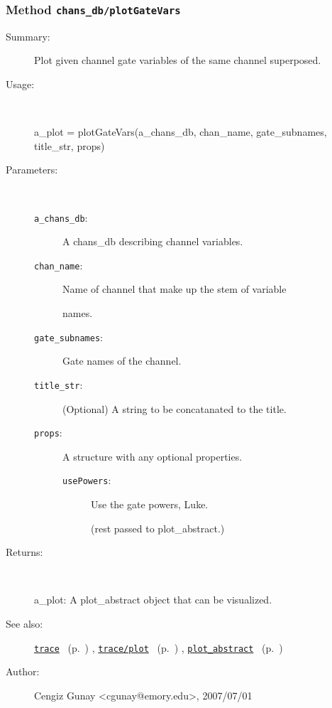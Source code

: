 \subsubsection[Method \texttt{plotGateVars}]{Method \texttt{chans\_db/plotGateVars}}%
%
\label{ref_chans_db__plotGateVars}%
\hypertarget{ref_chans_db__plotGateVars}{}%
\begin{description}
\item[Summary:]Plot given channel gate variables of the same channel superposed.
%
\item[Usage:]~%
\begin{lyxcode}%
a\_plot = plotGateVars(a\_chans\_db, chan\_name, gate\_subnames, title\_str, props)
%
\end{lyxcode}%
%
%
\item[Parameters:]~
\begin{description}%
\item[\texttt{a\_chans\_db}:]
 A chans\_db describing channel variables.
\item[\texttt{chan\_name}:]
 Name of channel that make up the stem of variable

names.
\item[\texttt{gate\_subnames}:]
 Gate names of the channel.
\item[\texttt{title\_str}:]
 (Optional) A string to be concatanated to the title.
\item[\texttt{props}:]
 A structure with any optional properties.
\begin{description}%
\item[\texttt{usePowers}:]
 Use the gate powers, Luke.

(rest passed to plot\_abstract.)
\end{description}%
\end{description}%
%
\item[Returns:
]~

	a\_plot: A plot\_abstract object that can be visualized.
%
%
\item[See also:]%
\hyperlink{ref_trace}{\texttt{trace}}%
\ (p.~\pageref{ref_trace})%
%
, \hyperlink{ref_trace__plot}{\texttt{trace/plot}}%
\ (p.~\pageref{ref_trace__plot})%
%
, \hyperlink{ref_plot_abstract}{\texttt{plot\_abstract}}%
\ (p.~\pageref{ref_plot_abstract})%
%
%
\item[Author:]%
Cengiz Gunay <cgunay@emory.edu>, 2007/07/01
%
\end{description}
\methodline%
